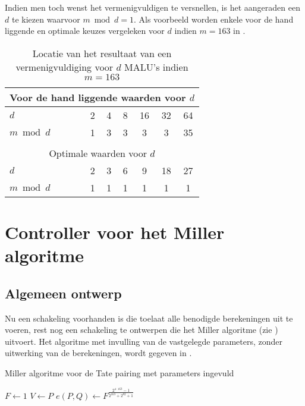 Indien men toch wenst het vermenigvuldigen te versnellen, is het aangeraden een $d$ te kiezen waarvoor $m \bmod d = 1$. Als voorbeeld worden enkele voor de hand liggende en optimale keuzes vergeleken voor $d$ indien $m = 163$ in .

\begin{table}[h]
	\caption{Locatie van het resultaat van een vermenigvuldiging voor $d$ MALU's indien \mbox{$m=163$}}
	\label{tabel-implementatie-woordbreedte-d}

	\centering
	\begin{tabular}{lcccccc}
		\toprule
		\multicolumn{7}{c}{Voor de hand liggende waarden voor $d$}\\
		\midrule
		$d$			& 2	& 4	& 8	& 16	& 32	& 64\\
		$m \bmod d \qquad$	& 1	& 3	& 3	& 3	& 3	& 35\\
		\bottomrule
		\multicolumn{7}{c}{}\\
		\toprule
		\multicolumn{7}{c}{Optimale waarden voor $d$}\\
		\midrule
		$d$			& 2	& 3	& 6	& 9	& 18	& 27\\
		$m \bmod d$	& 1	& 1	& 1	& 1	& 1	& 1\\
		\bottomrule
	\end{tabular}
\end{table}

\section{Controller voor het Miller algoritme\label{sectie-implementatie-miller}}

\subsection{Algemeen ontwerp\label{subsectie-implementatie-miller-ontwerp}}

Nu een schakeling voorhanden is die toelaat alle benodigde berekeningen uit te voeren, rest nog een schakeling te ontwerpen die het Miller algoritme (zie ) uitvoert. Het algoritme met invulling van de vastgelegde parameters, zonder uitwerking van de berekeningen, wordt gegeven in .

\begin{algorithm}[h]
	\caption{Miller algoritme voor de Tate pairing met parameters ingevuld}
	\label{algoritme-implementatie-miller-algemeen}
	$F \gets 1$\;
	$V \gets P$\;
	$e(P, Q) \gets F^{\frac{2^{4 \cdot 163} - 1}{2^{163} + 2^{82} + 1}}$\;
\end{algorithm}


